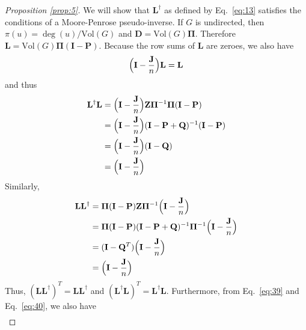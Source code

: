 \documentclass[10pt,twocolumn]{article}
\numberwithin{equation}{section}
\begin{document}
\begin{proof}[Proposition \ref{prop:5}]
  We will show that $\mathbf{L}^{\dagger}$ as defined by
  Eq.~\eqref{eq:13} satisfies the conditions of a Moore-Penrose
  pseudo-inverse. If $G$ is undirected, then $\pi(u) =
  \deg(u)/\mathrm{Vol}(G)$ and $\mathbf{D} = \mathrm{Vol}(G)
  \bm{\Pi}$. Therefore $\mathbf{L} = \mathrm{Vol}(G) \bm{\Pi}(\mathbf{I} -
  \mathbf{P})$. Because the row sums of $\mathbf{L}$ are zeroes, we
  also have
  \begin{equation}
    \label{eq:38}
    \Bigl(\mathbf{I} - \frac{\mathbf{J}}{n}\Bigr)\mathbf{L} = \mathbf{L}
  \end{equation}
  and thus
  \begin{equation}
    \label{eq:39}
    \begin{split}
      \mathbf{L}^{\dagger}\mathbf{L} &= \Bigl(\mathbf{I} -
      \frac{\mathbf{J}}{n}\Bigr) \mathbf{Z}
      \bm{\Pi}^{-1} \bm{\Pi}(\mathbf{I} - \mathbf{P}) \\
      &= \Bigl(\mathbf{I} - \frac{\mathbf{J}}{n}\Bigr) (\mathbf{I} -
      \mathbf{P} + \mathbf{Q})^{-1}
      (\mathbf{I} - \mathbf{P}) \\
      &= \Bigl(\mathbf{I} - \frac{\mathbf{J}}{n}\Bigr)(\mathbf{I} - \mathbf{Q}) \\
      &= \Bigl(\mathbf{I} - \frac{\mathbf{J}}{n}\Bigr)
   \end{split}
  \end{equation}
  Similarly,
  \begin{equation}
    \label{eq:40}
    \begin{split}
      \mathbf{L}\mathbf{L}^{\dagger} &= \bm{\Pi}(\mathbf{I} -
      \mathbf{P}) \mathbf{Z}
      \bm{\Pi}^{-1} \Bigl(\mathbf{I} - \frac{\mathbf{J}}{n}\Bigr) \\
      &= \bm{\Pi}(\mathbf{I} - \mathbf{P}) (\mathbf{I} - \mathbf{P} +
      \mathbf{Q})^{-1}
      \bm{\Pi}^{-1} \Bigl(\mathbf{I} - \frac{\mathbf{J}}{n}\Bigr) \\
      &= (\mathbf{I} - \mathbf{Q}^{T})\Bigl(\mathbf{I} - \frac{\mathbf{J}}{n}\Bigr) \\
      &= \Bigl(\mathbf{I} - \frac{\mathbf{J}}{n}\Bigr)
   \end{split}
  \end{equation}
  Thus, $(\mathbf{L}\mathbf{L}^{\dagger})^{T} =
  \mathbf{L}\mathbf{L}^{\dagger}$ and
  $(\mathbf{L}^{\dagger}\mathbf{L})^{T} =
  \mathbf{L}^{\dagger}\mathbf{L}$. Furthermore, from
  Eq.~\eqref{eq:39} and Eq.~\eqref{eq:40}, we also have 
  \begin{align*}

\end{align*}
\end{proof}
\end{document}
